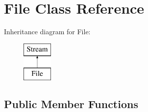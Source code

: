 \hypertarget{class_file}{}\section{File Class Reference}
\label{class_file}
Inheritance diagram for File\+:\begin{figure}[H]
\begin{center}
\leavevmode
\includegraphics[height=2.000000cm]{class_file}
\end{center}
\end{figure}
\subsection*{Public Member Functions}
